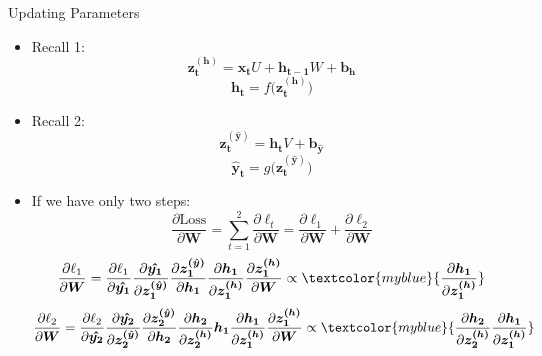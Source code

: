 \begin{frame}{Updating Parameters}
\centering
\begin{itemize}
    \item Recall 1:
        \begin{equation*} \bm{z^{(h)}_t}  = \bm{x_t}U + \bm{h_{t-1}}W + \bm{b_h}
        \end{equation*}
        \begin{equation*}
        \bm{h_t}  =  f\big( \bm{z^{(h)}_t} \big)
        \end{equation*}
    \item Recall 2:
            \begin{equation*}
            \bm{z^{(\hat{y})}_t} = \bm{h_t}V + \bm{b_{\hat{y}}}  
            \end{equation*}
            \begin{equation*}
            \bm{\hat{y}_t}  =  g\big(  \bm{z^{(\hat{y})}_t} \big) 
        \end{equation*}
    \item If we have only two steps: 
    \begin{equation*}
        \frac{\partial \text{Loss}}{ \partial \bm{W}} 
         = \sum_{t=1}^{2}   \frac{\partial \ell_t}{\partial \bm{W}} = \frac{\partial \ell_1}{\partial \bm{W}}  + \frac{\partial \ell_2}{\partial \bm{W}}  
    \end{equation*}
    \begin{equation*}
        \frac{\partial \ell_1}{\partial \bm{W}}  = 
        \frac{\partial \ell_1}{\partial \bm{\hat{y_1}}} \frac{\partial \bm{\hat{y_1}}}{\partial \bm{z^{(\hat{y})}_1}}  
        \frac{\partial \bm{z^{(\hat{y})}_1}}{\partial  \bm{h_1}}  
        \frac{\partial \bm{h_1}}{\partial \bm{z^{(h)}_1}}
        \frac{\partial \bm{z^{(h)}_1}}{\partial \bm{W}}  \propto   \textcolor{myblue}{\frac{\partial \bm{h_1}}{\partial \bm{z^{(h)}_1}}}
    \end{equation*}
    \begin{equation*}
    \frac{\partial \ell_2}{\partial \bm{W}}  = 
    \frac{\partial \ell_2}{\partial \bm{\hat{y_2}}} \frac{\partial \bm{\hat{y_2}}}{\partial \bm{z^{(\hat{y})}_2}}  
    \frac{\partial \bm{z^{(\hat{y})}_2}}{\partial  \bm{h_2}}  
    \frac{\partial \bm{h_2}}{\partial \bm{z^{(h)}_2}}\bm{h_1}\frac{\partial \bm{h_1}}{\partial \bm{z^{(h)}_1}}
        \frac{\partial \bm{z^{(h)}_1}}{\partial \bm{W}} \propto  
        \textcolor{myblue}{
        \frac{\partial \bm{h_2}}{\partial \bm{z^{(h)}_2}}\frac{\partial \bm{h_1}}{\partial \bm{z^{(h)}_1}}
        }
    \end{equation*}
     
\end{itemize}    
\end{frame}

